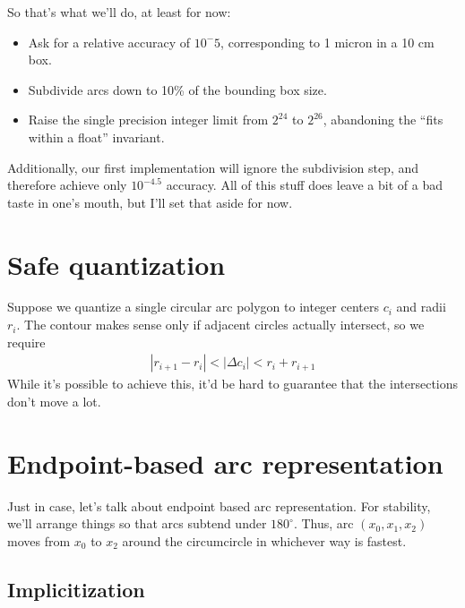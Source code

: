 \documentclass[11pt]{article}
\begin{document}
So that's what we'll do, at least for now:
\begin{itemize}
\item Ask for a relative accuracy of $10^-5$, corresponding to 1 micron in a 10 cm box.
\item Subdivide arcs down to 10\% of the bounding box size.
\item Raise the single precision integer limit from $2^{24}$ to $2^{26}$, abandoning the ``fits within a float'' invariant.
\end{itemize}
Additionally, our first implementation will ignore the subdivision step, and therefore achieve only $10^{-4.5}$ accuracy.  All of this stuff
does leave a bit of a bad taste in one's mouth, but I'll set that aside for now.

\section{Safe quantization}

Suppose we quantize a single circular arc polygon to integer centers $c_i$ and radii $r_i$.  The contour makes sense only if adjacent circles
actually intersect, so we require
\begin{align*}
|r_{i+1} - r_i| < |\Delta c_i| < r_i + r_{i+1}
\end{align*}
While it's possible to achieve this, it'd be hard to guarantee that the intersections don't move a lot.

\section{Endpoint-based arc representation}

Just in case, let's talk about endpoint based arc representation.  For stability, we'll arrange things so that arcs subtend under $180^\circ$.
Thus, arc $(x_0,x_1,x_2)$ moves from $x_0$ to $x_2$ around the circumcircle in whichever way is fastest.

\subsection{Implicitization}
\end{document}
